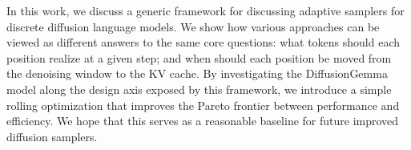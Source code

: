 In this work, we discuss a generic framework for discussing adaptive samplers for discrete diffusion language models.
We show how various approaches can be viewed as different answers to the same core questions: what tokens should each position realize at a given step; and when should each position be moved from the denoising window to the KV cache.
By investigating the DiffusionGemma model along the design axis exposed by this framework, we introduce a simple rolling optimization that improves the Pareto frontier between performance and efficiency.
We hope that this serves as a reasonable baseline for future improved diffusion samplers.